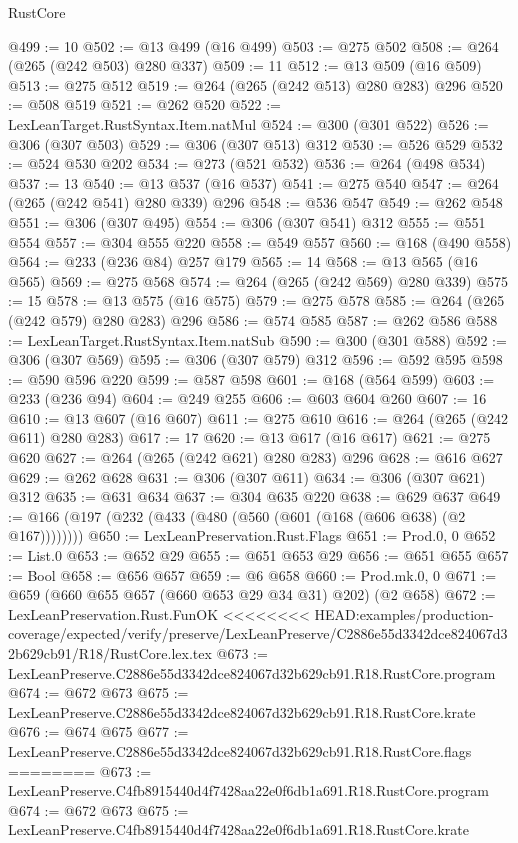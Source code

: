 \begin{lexlean}{RustCore}
\begin{coremodule}
{\begin{coremodule}
{{{{{{{{{@499 := 10
@502 := @13 @499 (@16 @499)
@503 := @275 @502
@508 := @264 (@265 (@242 @503) @280 @337)
@509 := 11
@512 := @13 @509 (@16 @509)
@513 := @275 @512
@519 := @264 (@265 (@242 @513) @280 @283) @296
@520 := @508 @519
@521 := @262 @520
@522 := LexLeanTarget.RustSyntax.Item.natMul
@524 := @300 (@301 @522)
@526 := @306 (@307 @503)
@529 := @306 (@307 @513) @312
@530 := @526 @529
@532 := @524 @530 @202
@534 := @273 (@521 @532)
@536 := @264 (@498 @534)
@537 := 13
@540 := @13 @537 (@16 @537)
@541 := @275 @540
@547 := @264 (@265 (@242 @541) @280 @339) @296
@548 := @536 @547
@549 := @262 @548
@551 := @306 (@307 @495)
@554 := @306 (@307 @541) @312
@555 := @551 @554
@557 := @304 @555 @220
@558 := @549 @557
@560 := @168 (@490 @558)
@564 := @233 (@236 @84) @257 @179
@565 := 14
@568 := @13 @565 (@16 @565)
@569 := @275 @568
@574 := @264 (@265 (@242 @569) @280 @339)
@575 := 15
@578 := @13 @575 (@16 @575)
@579 := @275 @578
@585 := @264 (@265 (@242 @579) @280 @283) @296
@586 := @574 @585
@587 := @262 @586
@588 := LexLeanTarget.RustSyntax.Item.natSub
@590 := @300 (@301 @588)
@592 := @306 (@307 @569)
@595 := @306 (@307 @579) @312
@596 := @592 @595
@598 := @590 @596 @220
@599 := @587 @598
@601 := @168 (@564 @599)
@603 := @233 (@236 @94)
@604 := @249 @255
@606 := @603 @604 @260
@607 := 16
@610 := @13 @607 (@16 @607)
@611 := @275 @610
@616 := @264 (@265 (@242 @611) @280 @283)
@617 := 17
@620 := @13 @617 (@16 @617)
@621 := @275 @620
@627 := @264 (@265 (@242 @621) @280 @283) @296
@628 := @616 @627
@629 := @262 @628
@631 := @306 (@307 @611)
@634 := @306 (@307 @621) @312
@635 := @631 @634
@637 := @304 @635 @220
@638 := @629 @637
@649 := @166 (@197 (@232 (@433 (@480 (@560 (@601 (@168 (@606 @638) (@2 @167))))))))
@650 := LexLeanPreservation.Rust.Flags
@651 := Prod.{0, 0}
@652 := List.{0}
@653 := @652 @29
@655 := @651 @653 @29
@656 := @651 @655
@657 := Bool
@658 := @656 @657
@659 := @6 @658
@660 := Prod.mk.{0, 0}
@671 := @659 (@660 @655 @657 (@660 @653 @29 @34 @31) @202) (@2 @658)
@672 := LexLeanPreservation.Rust.FunOK
<<<<<<<< HEAD:examples/production-coverage/expected/verify/preserve/LexLeanPreserve/C2886e55d3342dce824067d32b629cb91/R18/RustCore.lex.tex
@673 := LexLeanPreserve.C2886e55d3342dce824067d32b629cb91.R18.RustCore.program
@674 := @672 @673
@675 := LexLeanPreserve.C2886e55d3342dce824067d32b629cb91.R18.RustCore.krate
@676 := @674 @675
@677 := LexLeanPreserve.C2886e55d3342dce824067d32b629cb91.R18.RustCore.flags
========
@673 := LexLeanPreserve.C4fb8915440d4f7428aa22e0f6db1a691.R18.RustCore.program
@674 := @672 @673
@675 := LexLeanPreserve.C4fb8915440d4f7428aa22e0f6db1a691.R18.RustCore.krate
}}}}}}}}}
\end{coremodule}}
\end{coremodule}
\end{lexlean}
